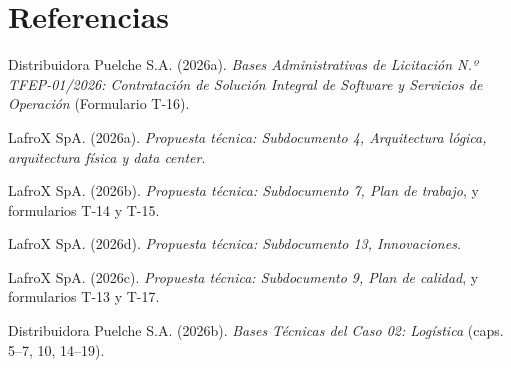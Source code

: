 \documentclass[carta,firma,sinnotas]{lafrox}
\begin{document}





\section*{Referencias}
\begingroup
\small\setlength{\parindent}{-0.5in}\setlength{\leftskip}{0.5in}\setlength{\parskip}{3pt}
Distribuidora Puelche S.A. (2026a). \emph{Bases Administrativas de Licitación N.º TFEP-01/2026: Contratación de Solución Integral de Software y Servicios de Operación} (Formulario T-16).


LafroX SpA. (2026a). \emph{Propuesta técnica: Subdocumento 4, Arquitectura lógica, arquitectura física y data center}.

LafroX SpA. (2026b). \emph{Propuesta técnica: Subdocumento 7, Plan de trabajo}, y formularios T-14 y T-15.

LafroX SpA. (2026d). \emph{Propuesta técnica: Subdocumento 13, Innovaciones}.

LafroX SpA. (2026c). \emph{Propuesta técnica: Subdocumento 9, Plan de calidad}, y formularios T-13 y T-17.

Distribuidora Puelche S.A. (2026b). \emph{Bases Técnicas del Caso 02: Logística} (caps. 5--7, 10, 14--19).


\endgroup
\end{document}
